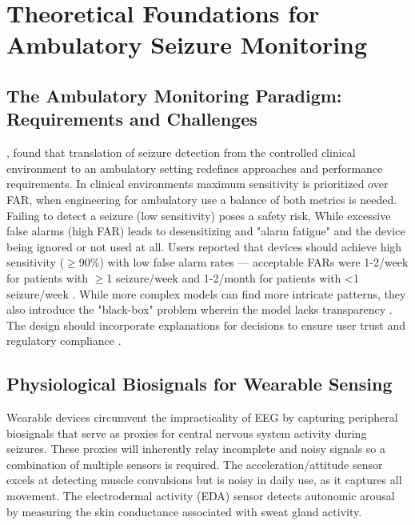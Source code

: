 \section{Theoretical Foundations for Ambulatory Seizure Monitoring}

\subsection{The Ambulatory Monitoring Paradigm: Requirements and Challenges}

\cite{beniczkyAutomatedSeizureDetection2021}, \cite{chenSeizuresDetectionUsing2022}
found that translation of seizure detection from the controlled clinical environment to
an ambulatory setting redefines approaches and performance requirements.
In clinical environments maximum sensitivity is prioritized over FAR,
when engineering for ambulatory use a balance of both metrics is needed.
Failing to detect a seizure (low sensitivity) poses a safety risk, While
excessive false alarms (high FAR) leads to desensitizing and "alarm fatigue"
and the device being ignored or not used at all.
Users reported that devices should achieve high sensitivity ($\geq$90\%) 
with low false alarm rates — acceptable FARs were 1-2/week for patients with $\geq$1
seizure/week and 1-2/month for patients with <1 seizure/week
\parencite{sivathambooPreferencesUserExperiences2022}.
While more complex models can find more intricate patterns, 
they also introduce the "black-box" problem wherein the model lacks transparency 
\cite{abualrobUnlockingNewFrontiers2025, ghaderiAdvancesMachineLearning2025}. 
The design should incorporate explanations for decisions to ensure
user trust and regulatory compliance 
\cite{abualrobUnlockingNewFrontiers2025, mironAutonomicBiosignalsSeizure2025}.

\subsection{Physiological Biosignals for Wearable Sensing}

Wearable devices circumvent the impracticality of EEG 
by capturing peripheral biosignals that serve as proxies 
for central nervous system activity during seizures.
These proxies will inherently relay incomplete and 
noisy signals so a combination of multiple sensors
is required. The acceleration/attitude sensor excels at detecting 
muscle convulsions but is noisy in daily use, as it captures all movement. 
The electrodermal activity (EDA) sensor detects autonomic arousal by 
measuring the skin conductance associated with sweat gland activity.

